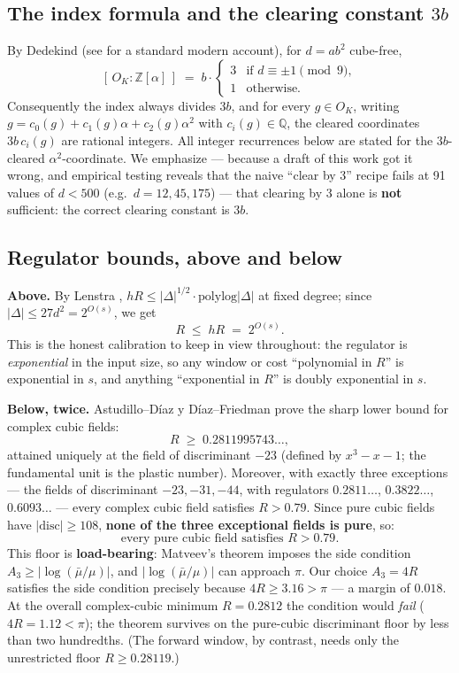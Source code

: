 \documentclass[11pt]{amsart}
\theoremstyle{plain}
\theoremstyle{remark}
\begin{document}
\subsection{The index formula and the clearing constant $3b$}
\label{sec:index}

By Dedekind \cite{Ded00} (see \cite{AW04} for a standard modern
account), for $d = ab^2$ cube-free,
\[
[\,O_K : \mathbb{Z}[\alpha]\,] \;=\; b \cdot
\begin{cases}
3 & \text{if } d \equiv \pm 1 \pmod 9,\\
1 & \text{otherwise.}
\end{cases}
\]
Consequently the index always divides $3b$, and for every $g \in O_K$,
writing $g = c_0(g) + c_1(g)\alpha + c_2(g)\alpha^2$ with
$c_i(g) \in \mathbb{Q}$, the cleared coordinates $3b\,c_i(g)$ are
rational integers. All integer recurrences below are stated for the
$3b$-cleared $\alpha^2$-coordinate. We emphasize --- because a draft
of this work got it wrong, and empirical testing reveals that the
naive ``clear by 3'' recipe fails at 91 values of $d < 500$ (e.g.\
$d = 12, 45, 175$) --- that clearing by $3$ alone is \textbf{not}
sufficient: the correct clearing constant is $3b$.

\subsection{Regulator bounds, above and below}\label{sec:regulator}

\textbf{Above.} By Lenstra \cite[Thm.~6.5]{Len92}, $hR \le
|\Delta|^{1/2}\cdot \mathrm{polylog}|\Delta|$ at fixed degree; since
$|\Delta| \le 27d^2 = 2^{O(s)}$, we get
\[
R \;\le\; hR \;=\; 2^{O(s)}.
\]
This is the honest calibration to keep in view throughout: the
regulator is \emph{exponential} in the input size, so any window or
cost ``polynomial in $R$'' is exponential in $s$, and anything
``exponential in $R$'' is doubly exponential in $s$.

\textbf{Below, twice.} Astudillo--D\'iaz y D\'iaz--Friedman
\cite[Thm.~7 and Table~1]{ADF16} prove the sharp lower bound for
complex cubic fields:
\[
R \;\ge\; 0.2811995743\ldots,
\]
attained uniquely at the field of discriminant $-23$ (defined by
$x^3 - x - 1$; the fundamental unit is the plastic number). Moreover,
with exactly three exceptions --- the fields of discriminant $-23,
-31, -44$, with regulators $0.2811\ldots$, $0.3822\ldots$,
$0.6093\ldots$ --- every complex cubic field satisfies $R > 0.79$.
Since pure cubic fields have $|\mathrm{disc}| \ge 108$, \textbf{none
of the three exceptional fields is pure}, so:
\[
\text{every pure cubic field satisfies } R > 0.79.
\]
This floor is \textbf{load-bearing}: Matveev's theorem imposes the
side condition $A_3 \ge |\log(\bar\mu/\mu)|$, and
$|\log(\bar\mu/\mu)|$ can approach $\pi$. Our choice $A_3 = 4R$
satisfies the side condition precisely because $4R \ge 3.16 > \pi$ ---
a margin of $0.018$. At the overall complex-cubic minimum $R = 0.2812$
the condition would \emph{fail} ($4R = 1.12 < \pi$); the theorem
survives on the pure-cubic discriminant floor by less than two
hundredths. (The forward window, by contrast, needs only the
unrestricted floor $R \ge 0.28119$.)
\end{document}
